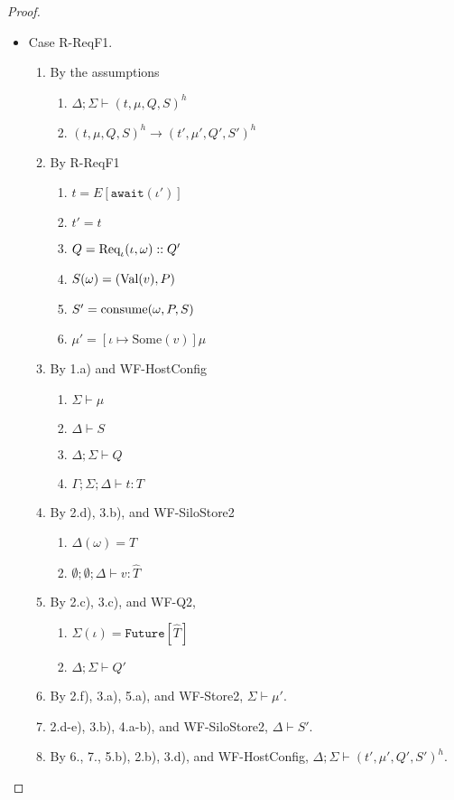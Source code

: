 \begin{proof}
\begin{itemize}
\item Case R-ReqF1.
\begin{enumerate}
\item By the assumptions
  \begin{enumerate}[label=(\alph*)]
  \item $\Delta ; \Sigma \vdash (t, \mu, Q, S)^h$
  \item $(t, \mu, Q, S)^h \longrightarrow (t', \mu', Q', S')^h$
  \end{enumerate}
\item By R-ReqF1
  \begin{enumerate}[label=(\alph*)]
  \item $t = E[\texttt{await}(\iota')]$
  \item $t' = t$
  \item $Q = {\textrm{Req}_{\iota}(\iota, \omega)} :: Q'$
  \item $S(\omega) = (\textrm{Val}(v), P)$
  \item $S' = {\textrm{consume}(\omega, P, S)}$
  \item $\mu' = [\iota \mapsto \text{Some}(v)]\mu$
  \end{enumerate}
\item By 1.a) and WF-HostConfig
  \begin{enumerate}[label=(\alph*)]
  \item $\Sigma \vdash \mu$
  \item $\Delta \vdash S$
  \item $\Delta ; \Sigma \vdash Q$
  \item $\Gamma ; \Sigma ; \Delta \vdash t : T$
  \end{enumerate}
\item By 2.d), 3.b), and WF-SiloStore2
  \begin{enumerate}[label=(\alph*)]
  \item $\Delta(\omega) = \hat{T}$
  \item $\emptyset ; \emptyset ; \Delta \vdash v : \hat{T}$
  \end{enumerate}
\item By 2.c), 3.c), and WF-Q2,
  \begin{enumerate}[label=(\alph*)]
  \item $\Sigma(\iota) = \texttt{Future}[\hat{T}]$
  \item $\Delta ; \Sigma \vdash Q'$
  \end{enumerate}
\item By 2.f), 3.a), 5.a), and WF-Store2, $\Sigma \vdash \mu'$.
\item 2.d-e), 3.b), 4.a-b), and WF-SiloStore2, $\Delta \vdash S'$.
\item By 6., 7., 5.b), 2.b), 3.d), and WF-HostConfig, $\Delta ; \Sigma \vdash (t', \mu', Q', S')^h$.
\end{enumerate}


\end{itemize}
\end{proof}

